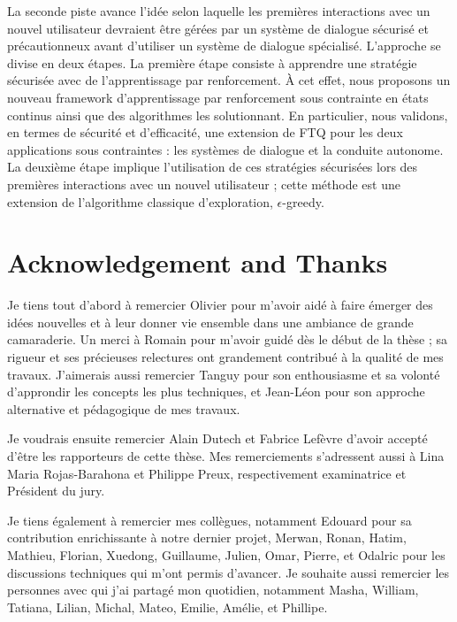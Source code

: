 La seconde piste avance l'idée selon laquelle les premières interactions avec un nouvel utilisateur devraient être gérées par un système de dialogue sécurisé et précautionneux avant d'utiliser un système de dialogue spécialisé. L'approche se divise en deux étapes. La première étape consiste à apprendre une stratégie sécurisée avec de l'apprentissage par renforcement. À cet effet, nous proposons un nouveau framework d'apprentissage par renforcement sous contrainte en états continus ainsi que des algorithmes les solutionnant. En particulier, nous validons, en termes de sécurité et d'efficacité, une extension de \acrlong{FTQ} pour les deux applications sous contraintes : les systèmes de dialogue et la conduite autonome. La deuxième étape implique l'utilisation de ces stratégies sécurisées lors des premières interactions avec un nouvel utilisateur ; cette méthode est une extension de l'algorithme classique d'exploration, $\epsilon$-greedy.



\newpage
%

\chapter*{Acknowledgement and Thanks}

Je tiens tout d'abord à remercier Olivier pour m'avoir aidé à faire émerger des idées nouvelles et à leur donner vie ensemble dans une ambiance de grande camaraderie. Un merci à Romain pour m'avoir guidé dès le début de la thèse ; sa rigueur et ses précieuses relectures ont grandement contribué à la qualité de mes travaux. J'aimerais aussi remercier Tanguy pour son enthousiasme et sa volonté d'approndir les concepts les plus techniques, et Jean-Léon pour son approche alternative et pédagogique de mes travaux.

Je voudrais ensuite remercier Alain Dutech et Fabrice Lefèvre d'avoir accepté d'être les rapporteurs de cette thèse. Mes remerciements s'adressent aussi à Lina Maria Rojas-Barahona et Philippe Preux, respectivement examinatrice et Président du jury.

Je tiens également à remercier mes collègues, notamment Edouard pour sa contribution enrichissante à notre dernier projet, Merwan, Ronan, Hatim, Mathieu, Florian, Xuedong, Guillaume, Julien, Omar, Pierre, et Odalric pour les discussions techniques qui m'ont permis d'avancer.  Je souhaite aussi remercier les personnes avec qui j'ai partagé mon quotidien, notamment Masha, William, Tatiana, Lilian, Michal,  Mateo, Emilie, Amélie, et Phillipe.

